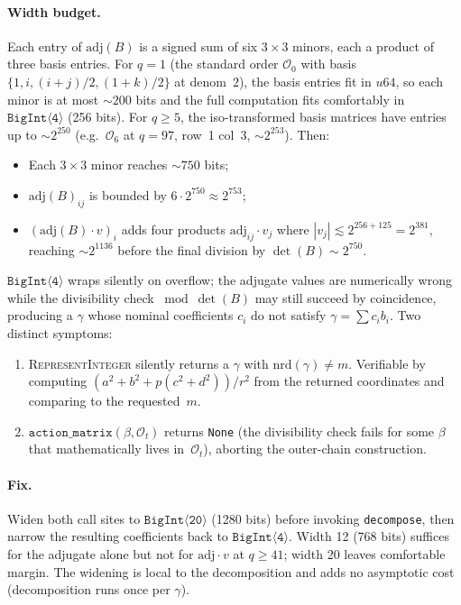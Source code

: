\paragraph{Width budget.}  Each entry of $\mathrm{adj}(B)$ is a
signed sum of six $3 \times 3$ minors, each a product of three
basis entries.  For $q = 1$ (the standard order $\mathcal{O}_0$
with basis $\{1, i, (i+j)/2, (1+k)/2\}$ at denom~$2$), the basis
entries fit in $u64$, so each minor is at most $\sim\!200$ bits
and the full computation fits comfortably in $\mathtt{BigInt\langle
4\rangle}$ (256 bits).  For $q \geq 5$, the iso-transformed
basis matrices have entries up to $\sim 2^{250}$
(e.g.~$\mathcal{O}_6$ at $q = 97$, row~1 col~3, $\sim 2^{253}$).
Then:
\begin{itemize}
\item Each $3 \times 3$ minor reaches $\sim 750$ bits;
\item $\mathrm{adj}(B)_{ij}$ is bounded by
  $6 \cdot 2^{750} \approx 2^{753}$;
\item $(\mathrm{adj}(B) \cdot v)_i$ adds four products
  $\mathrm{adj}_{ij} \cdot v_j$ where
  $|v_j| \lesssim 2^{256+125} = 2^{381}$, reaching
  $\sim\! 2^{1136}$ before the final division by
  $\det(B) \sim 2^{750}$.
\end{itemize}
$\mathtt{BigInt\langle 4\rangle}$ wraps silently on overflow; the
adjugate values are numerically wrong while the divisibility
check $\bmod \det(B)$ may still succeed by coincidence,
producing a $\gamma$ whose nominal coefficients $c_i$ do not
satisfy $\gamma = \sum c_i b_i$.  Two distinct symptoms:
\begin{enumerate}
  \item \textsc{RepresentInteger} silently returns a $\gamma$
    with $\mathrm{nrd}(\gamma) \neq m$.  Verifiable by computing
    $(a^2 + b^2 + p (c^2 + d^2)) / r^2$ from the returned
    coordinates and comparing to the requested~$m$.
  \item $\texttt{action\_matrix}(\beta, \mathcal{O}_t)$ returns
    \texttt{None} (the divisibility check fails for some
    $\beta$ that mathematically lives in~$\mathcal{O}_t$),
    aborting the outer-chain construction.
\end{enumerate}

\paragraph{Fix.}  Widen both call sites to
$\mathtt{BigInt\langle 20 \rangle}$ (1280 bits) before invoking
\texttt{decompose}, then narrow the resulting coefficients back
to $\mathtt{BigInt\langle 4\rangle}$.  Width 12 (768 bits)
suffices for the adjugate alone but not for
$\mathrm{adj} \cdot v$ at $q \geq 41$; width 20 leaves
comfortable margin.  The widening is local to the decomposition
and adds no asymptotic cost (decomposition runs once per
$\gamma$).

